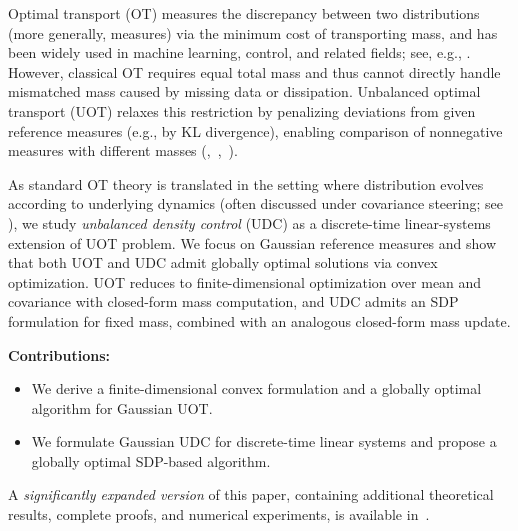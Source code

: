 \documentclass{ifacconf}
\begin{document}
Optimal transport (OT) measures the discrepancy between two distributions (more generally, measures) via the minimum cost of transporting mass, and has been widely used in machine learning, control, and related fields; see, e.g., \cite{Peyre25,Chen2021}.
However, classical OT requires equal total mass and thus cannot directly handle mismatched mass caused by missing data or dissipation. Unbalanced optimal transport (UOT) relaxes this restriction by penalizing deviations from given reference measures (e.g., by KL divergence), enabling comparison of nonnegative measures with different masses (\cite{Sejourne2023},~\cite{Payre2018},~\cite{Wang2024}).

As standard OT theory is translated in the setting where distribution evolves according to underlying dynamics (often discussed under covariance steering; see \cite{Liu2025,Nakashima25,Morimoto2024}), we study \emph{unbalanced density control} (UDC) as a discrete-time linear-systems extension of UOT problem. 
We focus on Gaussian reference measures and show that both UOT and UDC admit globally optimal solutions via convex optimization. UOT reduces to finite-dimensional optimization over mean and covariance with closed-form mass computation, and UDC admits an SDP formulation for fixed mass, combined with an analogous closed-form mass update.

\noindent\textbf{Contributions:}
\begin{itemize}
    \item We derive a finite-dimensional convex formulation and a globally optimal algorithm for Gaussian UOT.
    \item We formulate Gaussian UDC for discrete-time linear systems and propose a globally optimal SDP-based algorithm.
\end{itemize}
A \emph{significantly expanded version} of this paper, containing additional theoretical results, complete proofs, and numerical experiments, is available in~\cite{ref:UnOTDenCon:Extended:TAC}.

\end{document}

